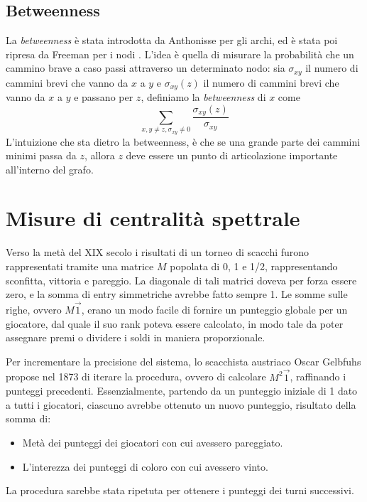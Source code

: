 \subsection{Betweenness}
La \textit{betweenness} è stata introdotta da Anthonisse \cite{ant} per gli archi, ed è stata poi ripresa da Freeman per i nodi \cite{morgan}. L'idea è quella di misurare la probabilità che un cammino brave a caso passi attraverso un determinato nodo: sia $\sigma_{xy}$ il numero di cammini brevi che vanno da $x$ a $y$ e $\sigma_{xy}(z)$ il numero di cammini brevi che vanno da $x$ a $y$ e passano per $z$, definiamo la \textit{betweenness} di $x$ come
\begin{equation}
	\sum_{x, y \neq z, \sigma_{xy} \neq 0}{\frac{\sigma_{xy}(z)}{\sigma_{xy}}}
\end{equation}
L'intuizione che sta dietro la betweenness, è che se una grande parte dei cammini minimi passa da $z$, allora $z$ deve essere un punto di articolazione importante all'interno del grafo.
\section{Misure di centralità spettrale}
Verso la metà del XIX secolo i risultati di un torneo di scacchi furono rappresentati tramite una matrice $M$ popolata di 0, 1 e 1/2, rappresentando sconfitta, vittoria e pareggio. La diagonale di tali matrici doveva per forza essere zero, e la somma di entry simmetriche avrebbe fatto sempre 1. Le somme sulle righe, ovvero $M\vec{1}$, erano un modo facile di fornire un punteggio globale per un giocatore, dal quale il suo rank poteva essere calcolato, in modo tale da poter assegnare premi o dividere i soldi in maniera proporzionale.

Per incrementare la precisione del sistema, lo scacchista austriaco Oscar Gelbfuhs propose nel 1873 di iterare la procedura, ovvero di calcolare $M^2\vec{1}$, raffinando i punteggi precedenti. Essenzialmente, partendo da un punteggio iniziale di 1 dato a tutti i giocatori, ciascuno avrebbe ottenuto un nuovo punteggio, risultato della somma di:
\begin{itemize}
	\item Metà dei punteggi dei giocatori con cui avessero pareggiato.
	\item L'interezza dei punteggi di coloro con cui avessero vinto.
\end{itemize}
La procedura sarebbe stata ripetuta per ottenere i punteggi dei turni successivi.


